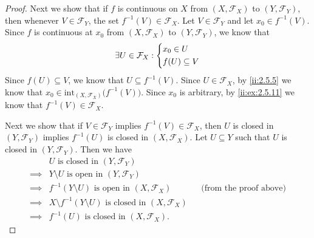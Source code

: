 \begin{proof}
  Next we show that if \(f\) is continuous on \(X\) from \((X, \mathcal{F}_X)\) to \((Y, \mathcal{F}_Y)\), then whenever \(V \in \mathcal{F}_Y\), the set \(f^{-1}(V) \in \mathcal{F}_X\).
  Let \(V \in \mathcal{F}_Y\) and let \(x_0 \in f^{-1}(V)\).
  Since \(f\) is continuous at \(x_0\) from \((X, \mathcal{F}_X)\) to \((Y, \mathcal{F}_Y)\), we know that
  \[
    \exists U \in \mathcal{F}_X : \begin{dcases}
      x_0 \in U \\
      f(U) \subseteq V
    \end{dcases}
  \]
  Since \(f(U) \subseteq V\), we know that \(U \subseteq f^{-1}(V)\).
  Since \(U \in \mathcal{F}_X\), by \cref{ii:2.5.5} we know that \(x_0 \in \text{int}_{(X, \mathcal{F}_X)}\big(f^{-1}(V)\big)\).
  Since \(x_0\) is arbitrary, by \cref{ii:ex:2.5.11} we know that \(f^{-1}(V) \in \mathcal{F}_X\).

  Next we show that if \(V \in \mathcal{F}_Y\) implies \(f^{-1}(V) \in \mathcal{F}_X\), then \(U\) is closed in \((Y, \mathcal{F}_Y)\) implies \(f^{-1}(U)\) is closed in \((X, \mathcal{F}_X)\).
  Let \(U \subseteq Y\) such that \(U\) is closed in \((Y, \mathcal{F}_Y)\).
  Then we have
  \begin{align*}
             & U \text{ is closed in } (Y, \mathcal{F}_Y)                                                                    \\
    \implies & Y \setminus U \text{ is open in } (Y, \mathcal{F}_Y)                                                          \\
    \implies & f^{-1}(Y \setminus U) \text{ is open in } (X, \mathcal{F}_X)               &  & \text{(from the proof above)} \\
    \implies & X \setminus f^{-1}(Y \setminus U) \text{ is closed in } (X, \mathcal{F}_X)                                    \\
    \implies & f^{-1}(U) \text{ is closed in } (X, \mathcal{F}_X).
  \end{align*}


\end{proof}
